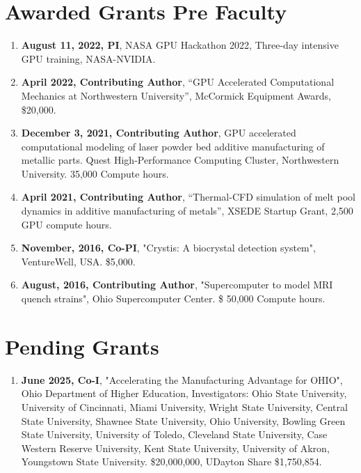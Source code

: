 \documentclass[11pt, letterpaper]{article}
\begin{document}
\section{Awarded Grants Pre Faculty}
    \begin{enumerate}[label=\arabic*., itemsep=-1pt, topsep=2pt]    
        \item \textbf{August 11, 2022, PI}, NASA GPU Hackathon 2022, Three-day intensive GPU training, NASA-NVIDIA.
        \item \textbf{April 2022, Contributing Author}, “GPU Accelerated Computational Mechanics at Northwestern University”, McCormick Equipment Awards, \$20,000.
        \item \textbf{December 3, 2021, Contributing Author}, GPU accelerated computational modeling of laser powder bed additive manufacturing of metallic parts. Quest High-Performance Computing Cluster, Northwestern University. 35,000 Compute hours.
        \item \textbf{April 2021, Contributing Author}, “Thermal-CFD simulation of melt pool dynamics in additive manufacturing of metals”, XSEDE Startup Grant, 2,500 GPU compute hours.
        \item \textbf{November, 2016, Co-PI}, "Crystis: A biocrystal detection system", VentureWell, USA. \$5,000.
        \item \textbf{August, 2016, Contributing Author}, "Supercomputer to model MRI quench strains", Ohio Supercomputer Center. \$ 50,000 Compute hours.
    \end{enumerate}
\ifdefined\isinternal
\section{Pending Grants}
    \begin{enumerate}[label=\arabic*., itemsep=-1pt, topsep=2pt]
        \item \textbf{June 2025, Co-I}, "Accelerating the Manufacturing Advantage for OHIO", Ohio Department of Higher Education, Investigators: Ohio State University, University of Cincinnati, Miami University, Wright State University, Central State University, Shawnee State University, Ohio University, Bowling Green State University, University of Toledo, Cleveland State University, Case Western Reserve University, Kent State University, University of Akron, Youngstown State University. \$20,000,000, UDayton Share \$1,750,854.
    \end{enumerate}
\end{document}
